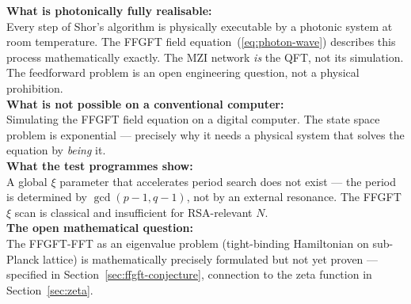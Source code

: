 \begin{conclusionBox}
\textbf{What is photonically fully realisable:}\\
Every step of Shor's algorithm is physically
executable by a photonic system at room temperature.
The FFGFT field equation~(\ref{eq:photon-wave})
describes this process mathematically exactly.
The MZI network \emph{is} the QFT, not its simulation.
The feedforward problem is an open engineering question,
not a physical prohibition.\\[6pt]

\textbf{What is not possible on a conventional computer:}\\
Simulating the FFGFT field equation on a digital computer.
The state space problem is exponential --- precisely why
it needs a physical system that solves the equation
by \emph{being} it.\\[6pt]

\textbf{What the test programmes show:}\\
A global $\xi$ parameter that accelerates period search
does not exist --- the period is
determined by $\gcd(p-1, q-1)$, not by
an external resonance. The FFGFT $\xi$ scan is
classical and insufficient for RSA-relevant $N$.\\[6pt]

\textbf{The open mathematical question:}\\
The FFGFT-FFT as an eigenvalue problem (tight-binding Hamiltonian
on sub-Planck lattice) is mathematically precisely formulated
but not yet proven --- specified in
Section~\ref{sec:ffgft-conjecture},
connection to the zeta function in Section~\ref{sec:zeta}.
\end{conclusionBox}

